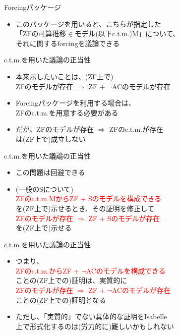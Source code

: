 \documentclass[17pt,aspectratio=169,xcolor=dvipsnames,table,dvipdfmx]{beamer}
\theoremstyle{definition}
\begin{document}
\begin{frame} {Forcingパッケージ}
    \begin{itemize}
        \item このパッケージを用いると、こちらが指定した\\
              「ZFの可算推移$\in$モデル{\small(以下c.t.m.)}M」について、\\
              それに関するforcingを議論できる
    \end{itemize}
\end{frame}

\begin{frame} {c.t.m.を用いた議論の正当性}
    \begin{itemize}
        \item 本来示したいことは、{\small (ZF上で)}\\
              ZFのモデルが存在 $\Rightarrow$ ZF + $\neg$ACのモデルが存在
        \item Forcingパッケージを利用する場合は、\\
              ZFのc.t.m.を用意する必要がある
        \item だが、ZFのモデルが存在 $\Rightarrow$ ZFのc.t.m.が存在\\
              は{\small (ZF上で)}成立しない
    \end{itemize}
\end{frame}

\begin{frame} {c.t.m.を用いた議論の正当性}
    \begin{itemize}
        \item この問題は回避できる
        \item {\small (一般のSについて) } \\
              \textcolor{red}{ZFのc.t.m MからZF + Sのモデルを構成できる}\\
              を{\small (ZF上で)}示せるとき、その証明を修正して\\
              \textcolor{red}{ZFのモデルが存在 $\Rightarrow$ ZF + Sのモデルが存在}\\
              を{\small (ZF上で)}示せる
    \end{itemize}
\end{frame}

\begin{frame} {c.t.m.を用いた議論の正当性}
    \begin{itemize}
        \item つまり、\\
              \textcolor{red}{ZFのc.t.m.からZF + $\neg$ACのモデルを構成できる}\\
              ことの{\small (ZF上での)}証明は、実質的に\\
              \textcolor{red}{ZFのモデルが存在 $\Rightarrow$ ZF + $\neg$ACのモデルが存在}\\
              ことの{\small (ZF上での)}証明となる
        \item ただし、「実質的」でない具体的な証明をIsabelle\\
              上で形式化するのは{\small (労力的に)}難しいかもしれない
    \end{itemize}
\end{frame}
\end{document}
